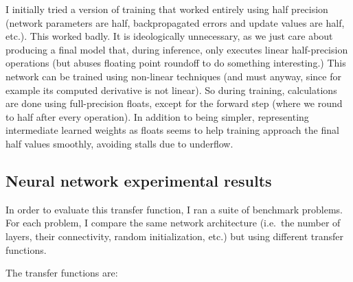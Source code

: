 \documentclass[twocolumn]{article}
\begin{document}
I initially tried a version of training that worked entirely using
half precision (network parameters are half, backpropagated errors and
update values are half, etc.). This worked badly. It is ideologically
unnecessary, as we just care about producing a final model that,
during inference, only executes linear half-precision operations (but
abuses floating point roundoff to do something interesting.) This
network can be trained using non-linear techniques (and must anyway,
since for example its computed derivative is not linear). So during
training, calculations are done using full-precision floats, except
for the forward step (where we round to half after every operation).
In addition to being simpler, representing intermediate learned
weights as floats seems to help training approach the final half
values smoothly, avoiding stalls due to underflow.

\subsection{Neural network experimental results}
In order to evaluate this transfer function, I ran a suite of
benchmark problems. For each problem, I compare the same network
architecture (i.e.~the number of layers, their connectivity, random
initialization, etc.) but using different transfer functions.

The transfer functions are:
\end{document}
